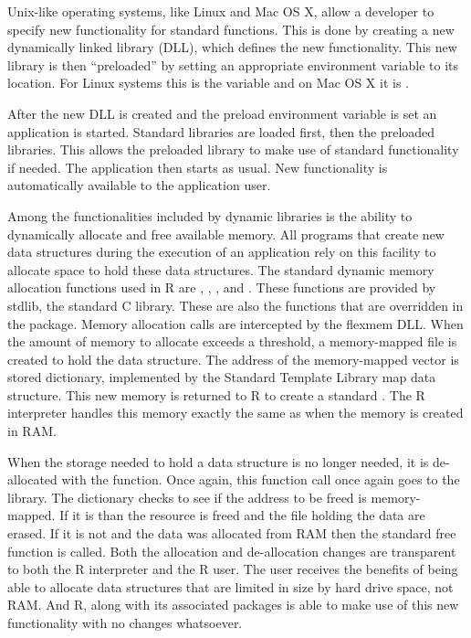 Unix-like operating systems, like Linux and Mac OS X, allow a developer to 
specify new functionality for standard functions. This is done by creating
a new dynamically linked library (DLL), which defines the new functionality. 
This new library is then ``preloaded'' by setting an appropriate environment 
variable to its location. For Linux systems this is the  
variable and on Mac OS X it is . 

After the new DLL is created and the preload environment variable is set an 
application is started. Standard libraries are loaded first, then the preloaded
libraries. This allows the preloaded library to make use of standard 
functionality if needed. The application then starts as usual. New functionality
is automatically available to the application user.

Among the functionalities included by dynamic libraries is the ability
to dynamically allocate and free available memory. All programs that create
new data structures during the execution of an application rely on this facility
to allocate space to hold these data structures. The standard dynamic memory
allocation functions used in R are , , 
, and . These
functions are provided by stdlib, the standard C library. These are also
the functions that are overridden in the  package. 
Memory allocation
calls are intercepted by the flexmem DLL. When the amount of memory to allocate
exceeds a threshold, a memory-mapped file is created to hold the data
structure. The address of the memory-mapped vector is stored dictionary, 
implemented by the Standard Template Library \citep{Plauger:STL} map data 
structure.  This new memory is returned to R to create a standard . 
The R interpreter handles this memory exactly the same as when the memory 
is created in RAM. 

When the storage needed to hold a data structure is no longer needed, it
is de-allocated with the  function. Once again, this function call
once again goes to the  library. The dictionary checks to see if
the address to be freed is memory-mapped. If it is than the resource is
freed and the file holding the data are erased. If it is not and the 
data was allocated from RAM then the standard free function is called.
Both the allocation and de-allocation changes are transparent to both the 
R interpreter and the R user. The user receives the benefits of being able
to allocate data structures that are limited in size by hard drive space,
not RAM. And R, along with its associated packages is able to make use
of this new functionality with no changes whatsoever.

